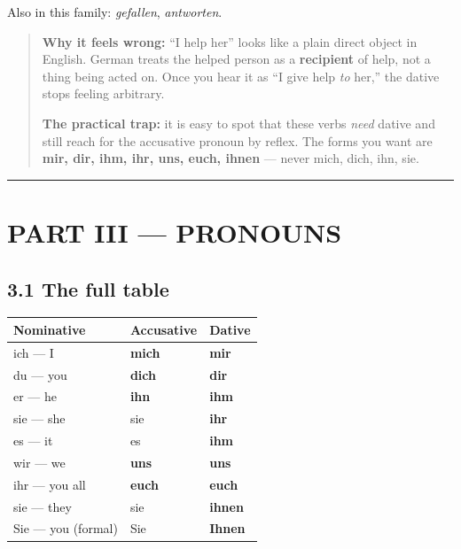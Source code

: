 \documentclass[
  11pt,
]{article}
\newcounter{none} %
\begin{document}
Also in this family: \emph{gefallen}, \emph{antworten}.

\begin{quote}
\textbf{Why it feels wrong:} ``I help her'' looks like a plain direct
object in English. German treats the helped person as a
\textbf{recipient} of help, not a thing being acted on. Once you hear it
as ``I give help \emph{to} her,'' the dative stops feeling arbitrary.

\textbf{The practical trap:} it is easy to spot that these verbs
\emph{need} dative and still reach for the accusative pronoun by reflex.
The forms you want are \textbf{mir, dir, ihm, ihr, uns, euch, ihnen} ---
never mich, dich, ihn, sie.
\end{quote}

\begin{center}\rule{0.5\linewidth}{0.5pt}\end{center}

\section{PART III --- PRONOUNS}\label{part-iii-pronouns}

\subsection{3.1 The full table}\label{the-full-table}

{\def\LTcaptype{none} %
\begin{longtable}[]{@{}lll@{}}
\toprule\noalign{}
Nominative & Accusative & Dative \\
\midrule\noalign{}
\endhead
\bottomrule\noalign{}
\endlastfoot
ich --- I & \textbf{mich} & \textbf{mir} \\
du --- you & \textbf{dich} & \textbf{dir} \\
er --- he & \textbf{ihn} & \textbf{ihm} \\
sie --- she & sie & \textbf{ihr} \\
es --- it & es & \textbf{ihm} \\
wir --- we & \textbf{uns} & \textbf{uns} \\
ihr --- you all & \textbf{euch} & \textbf{euch} \\
sie --- they & sie & \textbf{ihnen} \\
Sie --- you (formal) & Sie & \textbf{Ihnen} \\
\end{longtable}
}
\end{document}
